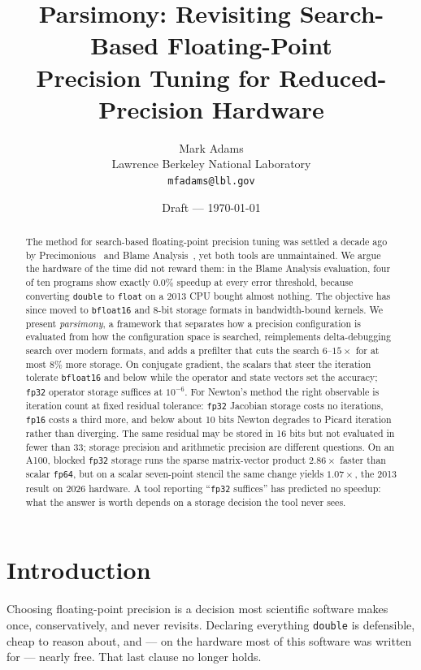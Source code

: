 \documentclass[11pt]{article}
\title{Parsimony: Revisiting Search-Based Floating-Point\\
       Precision Tuning for Reduced-Precision Hardware}
\author{Mark Adams\\
        \small Lawrence Berkeley National Laboratory\\
        \small \texttt{mfadams@lbl.gov}}
\date{Draft --- \today}
\begin{document}
\maketitle

\begin{abstract}
The method for search-based floating-point precision tuning was settled a decade
ago by Precimonious~\cite{precimonious} and Blame Analysis~\cite{blame}, yet both
tools are unmaintained. We argue the hardware of the time did not reward them: in
the Blame Analysis evaluation, four of ten programs show exactly $0.0\%$ speedup
at every error threshold, because converting \texttt{double} to \texttt{float} on
a 2013 CPU bought almost nothing. The objective has since moved to
\texttt{bfloat16} and 8-bit storage formats in bandwidth-bound kernels. We
present \emph{parsimony}, a framework that separates how a precision
configuration is evaluated from how the configuration space is searched,
reimplements delta-debugging search over modern formats, and adds a prefilter
that cuts the search $6$--$15\times$ for at most $8\%$ more storage. On
conjugate gradient, the scalars that steer the iteration tolerate
\texttt{bfloat16} and below while the operator and state vectors set the
accuracy; \texttt{fp32} operator storage suffices at $10^{-6}$. For Newton's
method the right observable is iteration count at fixed residual tolerance:
\texttt{fp32} Jacobian storage costs no iterations, \texttt{fp16} costs a third
more, and below about 10 bits Newton degrades to Picard iteration rather than
diverging. The same residual may be stored in 16 bits but not evaluated in fewer
than 33; storage precision and arithmetic precision are different questions. On
an A100, blocked \texttt{fp32} storage runs the sparse matrix-vector product
$2.86\times$ faster than scalar \texttt{fp64}, but on a scalar seven-point
stencil the same change yields $1.07\times$, the 2013 result on 2026 hardware.
A tool reporting ``\texttt{fp32} suffices'' has predicted no speedup: what the
answer is worth depends on a storage decision the tool never sees.
\end{abstract}

\section{Introduction}
\label{sec:intro}

Choosing floating-point precision is a decision most scientific software makes
once, conservatively, and never revisits. Declaring everything \texttt{double} is
defensible, cheap to reason about, and --- on the hardware most of this software
was written for --- nearly free. That last clause no longer holds.
\end{document}
